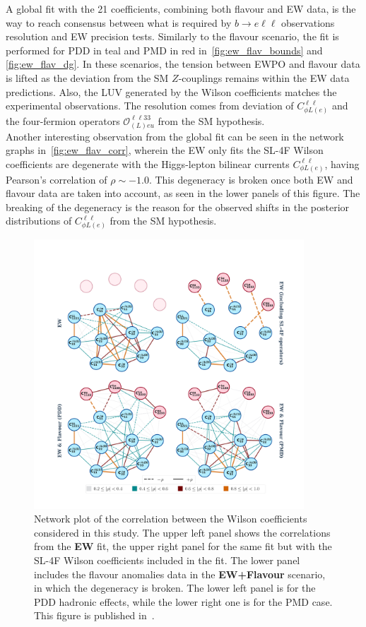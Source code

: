 A global fit with the 21 coefficients, combining both flavour and EW data, is the way to reach consensus between what is required by $ b \to e \ell \ell$ observations resolution and EW precision tests. Similarly to the flavour scenario, the fit is performed for PDD in \textcolor[HTML]{0f7678}{teal} and PMD in \textcolor[HTML]{760003}{red} in~\autoref{fig:ew_flav_bounds} and \autoref{fig:ew_flav_dg}. In these scenarios, the tension between EWPO and flavour data is lifted as the deviation from the SM $Z$-couplings remains within the EW data predictions. Also, the LUV generated by the Wilson coefficients matches the experimental observations. The resolution comes from deviation of $C_{\phi L (e)}^{\ell \ell}$ and the four-fermion operators $\mathcal{O}_{(L)eu}^{\ell \ell 3 3}$ from the SM hypothesis. \\ Another interesting observation from the global fit can be seen in the network graphs in~\autoref{fig:ew_flav_corr}, wherein the EW only fits the SL-4F Wilson coefficients are degenerate with the Higgs-lepton bilinear currents $C_{\phi L (e)}^{\ell \ell}$, having Pearson's correlation of  $\rho \sim -1.0$. This degeneracy is broken once both EW and flavour data are taken into account, as seen in the lower panels of this figure. The breaking of the degeneracy is the reason for the observed shifts in the posterior distributions of $C_{\phi L (e)}^{\ell \ell}$ from the SM hypothesis. \\
\begin{figure}[h!]
	\centering
	\includegraphics[width=0.9\textwidth]{figures/fixed_EW_flavour.pdf}
	\caption{ Network plot of the correlation between the Wilson coefficients considered in this study. The upper left panel shows the correlations from the \textbf{EW} fit, the upper right panel for the same fit but with the SL-4F Wilson coefficients included in the fit. The lower panel includes the flavour anomalies data in the \textbf{EW+Flavour}  scenario, in which the degeneracy is broken. The lower left panel is for the PDD hadronic effects, while the lower right one is for the PMD case. This figure is published in~\cite{Alasfar:2020mne}. 
	}
	\label{fig:ew_flav_corr}
\end{figure}
